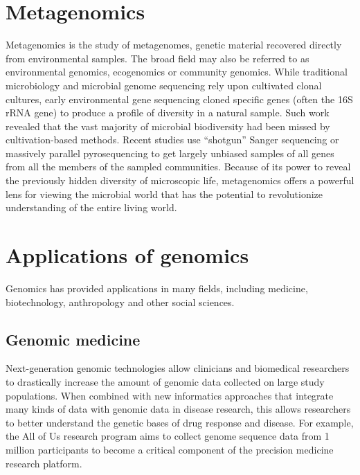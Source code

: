 \hypertarget{metagenomics}{%
\section{Metagenomics}\label{metagenomics}}

Metagenomics is the study of metagenomes, genetic material recovered directly from environmental samples. The broad field may also be referred to as environmental genomics, ecogenomics or community genomics. While traditional microbiology and microbial genome sequencing rely upon cultivated clonal cultures, early environmental gene sequencing cloned specific genes (often the 16S rRNA gene) to produce a profile of diversity in a natural sample. Such work revealed that the vast majority of microbial biodiversity had been missed by cultivation-based methods. Recent studies use ``shotgun'' Sanger sequencing or massively parallel pyrosequencing to get largely unbiased samples of all genes from all the members of the sampled communities. Because of its power to reveal the previously hidden diversity of microscopic life, metagenomics offers a powerful lens for viewing the microbial world that has the potential to revolutionize understanding of the entire living world.

\hypertarget{applications-of-genomics}{%
\section{Applications of genomics}\label{applications-of-genomics}}

Genomics has provided applications in many fields, including medicine, biotechnology, anthropology and other social sciences.

\hypertarget{genomic-medicine}{%
\subsection{Genomic medicine}\label{genomic-medicine}}

Next-generation genomic technologies allow clinicians and biomedical researchers to drastically increase the amount of genomic data collected on large study populations. When combined with new informatics approaches that integrate many kinds of data with genomic data in disease research, this allows researchers to better understand the genetic bases of drug response and disease. For example, the All of Us research program aims to collect genome sequence data from 1 million participants to become a critical component of the precision medicine research platform.

